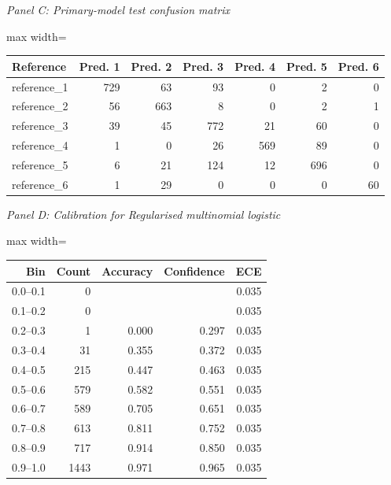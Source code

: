 \endgroup
\par\medskip\noindent\textit{Panel C: Primary-model test confusion matrix}\par
\begingroup
\scriptsize
\setlength{\tabcolsep}{3pt}
\begin{center}
\begin{adjustbox}{max width=\linewidth}
\begin{tabular}{lrrrrrr}
\toprule
Reference & Pred. 1 & Pred. 2 & Pred. 3 & Pred. 4 & Pred. 5 & Pred. 6 \\
\midrule
reference\_1 & 729 & 63 & 93 & 0 & 2 & 0 \\
reference\_2 & 56 & 663 & 8 & 0 & 2 & 1 \\
reference\_3 & 39 & 45 & 772 & 21 & 60 & 0 \\
reference\_4 & 1 & 0 & 26 & 569 & 89 & 0 \\
reference\_5 & 6 & 21 & 124 & 12 & 696 & 0 \\
reference\_6 & 1 & 29 & 0 & 0 & 0 & 60 \\
\bottomrule
\end{tabular}
\end{adjustbox}
\end{center}
\endgroup
\par\medskip\noindent\textit{Panel D: Calibration for Regularised multinomial logistic}\par
\begingroup
\scriptsize
\setlength{\tabcolsep}{3pt}
\begin{center}
\begin{adjustbox}{max width=\linewidth}
\begin{tabular}{rrrrr}
\toprule
Bin & Count & Accuracy & Confidence & ECE \\
\midrule
0.0--0.1 & 0 &  &  & 0.035 \\
0.1--0.2 & 0 &  &  & 0.035 \\
0.2--0.3 & 1 & 0.000 & 0.297 & 0.035 \\
0.3--0.4 & 31 & 0.355 & 0.372 & 0.035 \\
0.4--0.5 & 215 & 0.447 & 0.463 & 0.035 \\
0.5--0.6 & 579 & 0.582 & 0.551 & 0.035 \\
0.6--0.7 & 589 & 0.705 & 0.651 & 0.035 \\
0.7--0.8 & 613 & 0.811 & 0.752 & 0.035 \\
0.8--0.9 & 717 & 0.914 & 0.850 & 0.035 \\
0.9--1.0 & 1443 & 0.971 & 0.965 & 0.035 \\
\bottomrule
\end{tabular}
\end{adjustbox}
\end{center}
